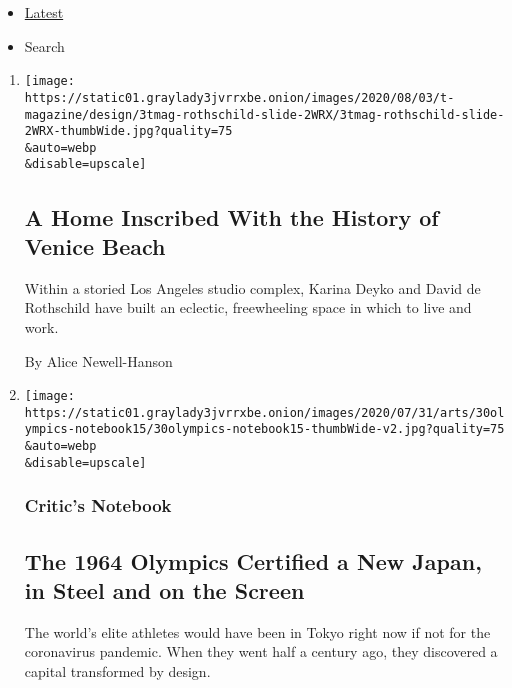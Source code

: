 \begin{itemize}
\tightlist
\item
  \protect\hyperlink{stream-panel}{Latest}
\item
  Search
\end{itemize}

\begin{enumerate}
\def\labelenumi{\arabic{enumi}.}
\item
  \href{/2020/08/03/t-magazine/david-de-rothschild-venice-home-design.html}{}

  \texttt{[image: https://static01.graylady3jvrrxbe.onion/images/2020/08/03/t-magazine/design/3tmag-rothschild-slide-2WRX/3tmag-rothschild-slide-2WRX-thumbWide.jpg?quality=75\\\&auto=webp\\\&disable=upscale]}

  \hypertarget{a-home-inscribed-with-the-history-of-venice-beach}{%
  \subsection{A Home Inscribed With the History of Venice
  Beach}\label{a-home-inscribed-with-the-history-of-venice-beach}}

  Within a storied Los Angeles studio complex, Karina Deyko and David de
  Rothschild have built an eclectic, freewheeling space in which to live
  and work.

  By Alice Newell-Hanson
\item
  \href{/2020/07/30/arts/design/tokyo-olympics-1964-design.html}{}

  \texttt{[image: https://static01.graylady3jvrrxbe.onion/images/2020/07/31/arts/30olympics-notebook15/30olympics-notebook15-thumbWide-v2.jpg?quality=75\\\&auto=webp\\\&disable=upscale]}

  \hypertarget{critics-notebook}{%
  \subsubsection{Critic's Notebook}\label{critics-notebook}}

  \hypertarget{the-1964-olympics-certified-a-new-japan-in-steel-and-on-the-screen}{%
  \subsection{The 1964 Olympics Certified a New Japan, in Steel and on
  the
  Screen}\label{the-1964-olympics-certified-a-new-japan-in-steel-and-on-the-screen}}

  The world's elite athletes would have been in Tokyo right now if not
  for the coronavirus pandemic. When they went half a century ago, they
  discovered a capital transformed by design.


\end{enumerate}
